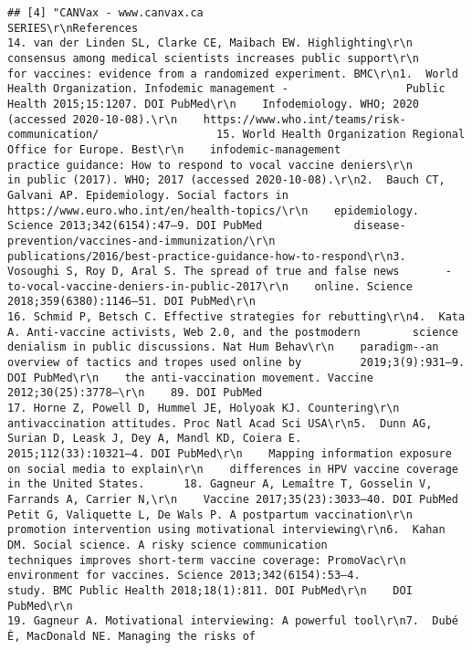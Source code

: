 \documentclass[
]{book}
\begin{document}
\begin{verbatim}
## [4] "CANVax - www.canvax.ca                                                                                           SERIES\r\nReferences                                                         14. van der Linden SL, Clarke CE, Maibach EW. Highlighting\r\n                                                                       consensus among medical scientists increases public support\r\n                                                                       for vaccines: evidence from a randomized experiment. BMC\r\n1.  World Health Organization. Infodemic management -                  Public Health 2015;15:1207. DOI PubMed\r\n    Infodemiology. WHO; 2020 (accessed 2020-10-08).\r\n    https://www.who.int/teams/risk-communication/                  15. World Health Organization Regional Office for Europe. Best\r\n    infodemic-management                                               practice guidance: How to respond to vocal vaccine deniers\r\n                                                                       in public (2017). WHO; 2017 (accessed 2020-10-08).\r\n2.  Bauch CT, Galvani AP. Epidemiology. Social factors in              https://www.euro.who.int/en/health-topics/\r\n    epidemiology. Science 2013;342(6154):47–9. DOI PubMed              disease-prevention/vaccines-and-immunization/\r\n                                                                       publications/2016/best-practice-guidance-how-to-respond\r\n3.  Vosoughi S, Roy D, Aral S. The spread of true and false news       -to-vocal-vaccine-deniers-in-public-2017\r\n    online. Science 2018;359(6380):1146–51. DOI PubMed\r\n                                                                   16. Schmid P, Betsch C. Effective strategies for rebutting\r\n4.  Kata A. Anti-vaccine activists, Web 2.0, and the postmodern        science denialism in public discussions. Nat Hum Behav\r\n    paradigm--an overview of tactics and tropes used online by         2019;3(9):931–9. DOI PubMed\r\n    the anti-vaccination movement. Vaccine 2012;30(25):3778–\r\n    89. DOI PubMed                                                 17. Horne Z, Powell D, Hummel JE, Holyoak KJ. Countering\r\n                                                                       antivaccination attitudes. Proc Natl Acad Sci USA\r\n5.  Dunn AG, Surian D, Leask J, Dey A, Mandl KD, Coiera E.             2015;112(33):10321–4. DOI PubMed\r\n    Mapping information exposure on social media to explain\r\n    differences in HPV vaccine coverage in the United States.      18. Gagneur A, Lemaître T, Gosselin V, Farrands A, Carrier N,\r\n    Vaccine 2017;35(23):3033–40. DOI PubMed                            Petit G, Valiquette L, De Wals P. A postpartum vaccination\r\n                                                                       promotion intervention using motivational interviewing\r\n6.  Kahan DM. Social science. A risky science communication            techniques improves short-term vaccine coverage: PromoVac\r\n    environment for vaccines. Science 2013;342(6154):53–4.             study. BMC Public Health 2018;18(1):811. DOI PubMed\r\n    DOI PubMed\r\n                                                                   19. Gagneur A. Motivational interviewing: A powerful tool\r\n7.  Dubé È, MacDonald NE. Managing the risks of 
\end{verbatim}
\end{document}
